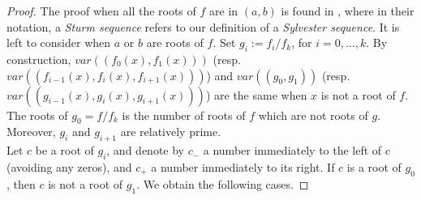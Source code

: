 \documentclass[12pt]{amsart}
\theoremstyle{definition}
\begin{document}
\begin{proof} The proof when all the roots of $f$ are in $(a,b)$ is found in \cite{MR1659509}, where in their notation, a \textit{Sturm sequence} refers to our definition of a \textit{Sylvester sequence}. It is left to consider when $a$ or $b$ are roots of $f$. Set $g_{i} := f_{i}/f_{k}$, for $i=0,\dots, k$. By construction, $var((f_{0}(x),f_{1}(x)))$ (resp. $var((f_{i-1}(x),f_{i}(x),f_{i+1}(x)))$) and $var((g_{0},g_{1}))$ (resp. $var((g_{i-1}(x),g_{i}(x),g_{i+1}(x)))$) are the same when $x$ is not a root of $f$. The roots of $g_{0} = f/f_{k}$ is the number of roots of $f$ which are not roots of $g$. Moreover, $g_{i}$ and $g_{i+1}$ are relatively prime.\\

\noindent Let $c$ be a root of $g_{i}$, and denote by $c_{-}$ a number immediately to the left of $c$ (avoiding any zeros), and $c_{+}$ a number immediately to its right. If $c$ is a root of $g_{0}$, then $c$ is not a root of $g_{1}$. We obtain the following cases.



\end{proof}
\end{document}
